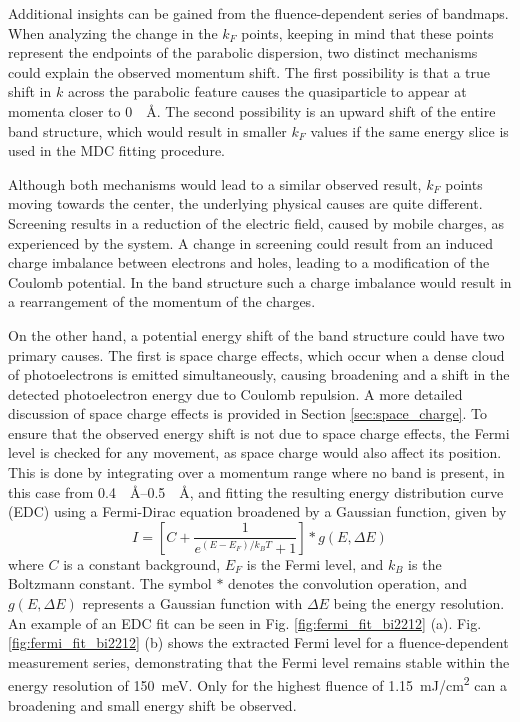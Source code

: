 Additional insights can be gained from the fluence-dependent series of bandmaps.
When analyzing the change in the $k_F$ points, keeping in mind that these points represent the endpoints of the parabolic dispersion, two distinct mechanisms could explain the observed momentum shift.
The first possibility is that a true shift in $k$ across the parabolic feature causes the quasiparticle to appear at momenta closer to \qty{0}{\per\angstrom}.
The second possibility is an upward shift of the entire band structure, which would result in smaller $k_F$ values if the same energy slice is used in the MDC fitting procedure.

Although both mechanisms would lead to a similar observed result, $k_F$ points moving towards the center, the underlying physical causes are quite different.
Screening results in a reduction of the electric field, caused by mobile charges, as experienced by the system.
A change in screening could result from an induced charge imbalance between electrons and holes, leading to a modification of the Coulomb potential.
In the band structure such a charge imbalance would result in a rearrangement of the momentum of the charges.

On the other hand, a potential energy shift of the band structure could have two primary causes.
The first is space charge effects, which occur when a dense cloud of photoelectrons is emitted simultaneously, causing broadening and a shift in the detected photoelectron energy due to Coulomb repulsion.
A more detailed discussion of space charge effects is provided in Section \ref{sec:space_charge}.
To ensure that the observed energy shift is not due to space charge effects, the Fermi level is checked for any movement, as space charge would also affect its position.
This is done by integrating over a momentum range where no band is present, in this case from \qtyrange{0.4}{0.5}{\per\angstrom}, and fitting the resulting energy distribution curve (EDC) using a Fermi-Dirac equation broadened by a Gaussian function, given by
\begin{equation}
	I = \left[ C + \frac{1}{e^{(E-E_F)/k_BT}+1} \right] * g(E,\Delta E)
\end{equation}
where $C$ is a constant background, $E_F$ is the Fermi level, and $k_B$ is the Boltzmann constant.
The symbol $*$ denotes the convolution operation, and $g(E, \Delta E)$ represents a Gaussian function with $\Delta E$ being the energy resolution.
An example of an EDC fit can be seen in Fig. \ref{fig:fermi_fit_bi2212} (a).
Fig. \ref{fig:fermi_fit_bi2212} (b) shows the extracted Fermi level for a fluence-dependent measurement series, demonstrating that the Fermi level remains stable within the energy resolution of \qty{150}{\milli\electronvolt}.
Only for the highest fluence of \qty{1.15}{\milli\joule/\centi\meter\squared} can a broadening and small energy shift be observed.

